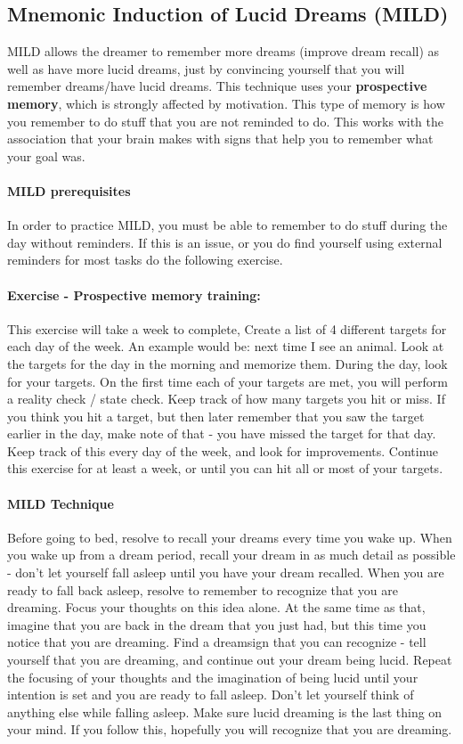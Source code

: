 \documentclass{report}
\begin{document}
\subsection{Mnemonic Induction of Lucid Dreams (MILD)}
MILD allows the dreamer to remember more dreams (improve dream recall) as well as have more lucid dreams, just by convincing yourself that you will remember dreams/have lucid dreams. This technique uses your \textbf{prospective memory}, which is strongly affected by motivation. This type of memory is how you remember to do stuff that you are not reminded to do. This works with the association that your brain makes with signs that help you to remember what your goal was.

\paragraph{MILD prerequisites} In order to practice MILD, you must be able to remember to do stuff during the day without reminders. If this is an issue, or you do find yourself using external reminders for most tasks do the following exercise.

\paragraph{Exercise - Prospective memory training:} This exercise will take a week to complete, Create a list of 4 different targets for each day of the week. An example would be: next time I see an animal. Look at the targets for the day in the morning and memorize them. During the day, look for your targets. On the first time each of your targets are met, you will perform a reality check / state check. Keep track of how many targets you hit or miss. If you think you hit a target, but then later remember that you saw the target earlier in the day, make note of that - you have missed the target for that day. Keep track of this every day of the week, and look for improvements. Continue this exercise for at least a week, or until you can hit all or most of your targets.

\paragraph{MILD Technique} Before going to bed, resolve to recall your dreams every time you wake up. When you wake up from a dream period, recall your dream in as much detail as possible - don't let yourself fall asleep until you have your dream recalled. When you are ready to fall back asleep, resolve to remember to recognize that you are dreaming. Focus your thoughts on this idea alone. At the same time as that, imagine that you are back in the dream that you just had, but this time you notice that you are dreaming. Find a dreamsign that you can recognize - tell yourself that you are dreaming, and continue out your dream being lucid. Repeat the focusing of your thoughts and the imagination of being lucid until your intention is set and you are ready to fall asleep. Don't let yourself think of anything else while falling asleep. Make sure lucid dreaming is the last thing on your mind. If you follow this, hopefully you will recognize that you are dreaming.
\end{document}
